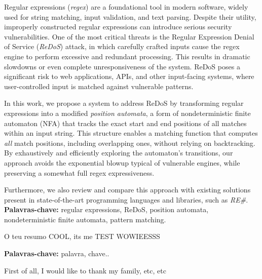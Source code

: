 Regular expressions (\emph{regex}) are a foundational tool in modern software, widely used for string matching, input validation, and text parsing. Despite their utility, improperly constructed regular expressions can introduce serious security vulnerabilities. One of the most critical threats is the Regular Expression Denial of Service (\emph{ReDoS}) attack, in which carefully crafted inputs cause the regex engine to perform excessive and redundant processing. This results in dramatic slowdowns or even complete unresponsiveness of the system. ReDoS poses a significant risk to web applications, APIs, and other input-facing systems, where user-controlled input is matched against vulnerable patterns.

In this work, we propose a system to address ReDoS by transforming regular expressions into a modified \emph{position automata}, a form of nondeterministic finite automaton (NFA) that tracks the exact start and end positions of all matches within an input string. This structure enables a matching function that computes \emph{all} match positions, including overlapping ones, without relying on backtracking. By exhaustively and efficiently exploring the automaton's transitions, our approach avoids the exponential blowup typical of vulnerable engines, while preserving a somewhat full regex expressiveness.

Furthermore, we also review and compare this approach with existing solutions present in state-of-the-art programming languages and libraries, such as \emph{RE\#}.
\textbf{Palavras-chave:} regular expressions, ReDoS, position automata, nondeterministic finite automata, pattern matching.

O teu resumo COOL, its me TEST WOWIEESSS

\textbf{Palavras-chave:} palavra, chave..



First of all, I would like to thank my family, etc, etc